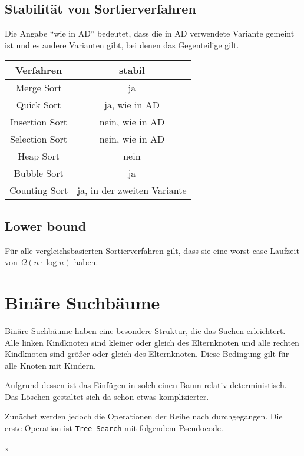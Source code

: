 \documentclass[10pt,a4paper,oneside,ngerman,numbers=noenddot]{scrartcl}
\begin{document}
	\subsection{Stabilität von Sortierverfahren}
		
		Die Angabe "`wie in AD"' bedeutet, dass die in AD verwendete Variante gemeint ist und es andere Varianten gibt, bei denen das Gegenteilige gilt.
		
		\begin{tabular}{c|c}
			Verfahren & stabil \\
			\hline
			Merge Sort & ja \\
			Quick Sort & ja, wie in AD \\
			Insertion Sort & nein, wie in AD \\
			Selection Sort & nein, wie in AD \\
			Heap Sort & nein \\
			Bubble Sort & ja \\
			Counting Sort & ja, in der zweiten Variante
		\end{tabular}
		
	\subsection{Lower bound}
	
		Für alle vergleichsbasierten Sortierverfahren gilt, dass sie eine worst case Laufzeit von $\Omega(n \cdot \log n)$ haben.
		
\section{Binäre Suchbäume}

	Binäre Suchbäume haben eine besondere Struktur, die das Suchen erleichtert. Alle linken Kindknoten sind kleiner oder gleich des Elternknoten und alle rechten Kindknoten sind größer oder gleich des Elternknoten. Diese Bedingung gilt für alle Knoten mit Kindern.
	
	Aufgrund dessen ist das Einfügen in solch einen Baum relativ deterministisch. Das Löschen gestaltet sich da schon etwas komplizierter.
	
	Zunächst werden jedoch die Operationen der Reihe nach durchgegangen. Die erste Operation ist \texttt{Tree-Search} mit folgendem Pseudocode.
	
	\begin{algorithmic}[1]
				\State \Return x
			\EndIf
				\State \Return {}
			\Else
				\State \Return {}			
			\EndIf
		\EndFunction
	\end{algorithmic}
	
\end{document}

